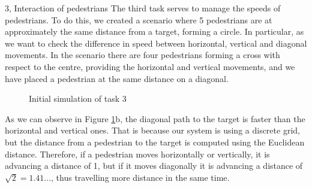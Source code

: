 \documentclass[10pt,a4paper]{article}
\begin{document}
\begin{task}{3, Interaction of pedestrians}
The third task serves to manage the speeds of pedestrians. To do this, we created a scenario where 5 pedestrians are at approximately the same distance from a target, forming a circle. In particular, as we want to check the difference in speed between horizontal, vertical and diagonal movements. In the scenario there are four pedestrians forming a cross with respect to the centre, providing the horizontal and vertical movements, and we have placed a pedestrian at the same distance on a diagonal.
\begin{figure}[H] 
\centering
{}
\caption{Initial simulation of task 3}
\label{init_sim_3}
\end{figure}

As we can observe in Figure \ref{init_sim_3}b, the diagonal path to the target is faster than the horizontal and vertical ones. That is because our system is using a discrete grid, but the distance from a pedestrian to the target is computed using the Euclidean distance. Therefore, if a pedestrian moves horizontally or vertically, it is advancing a distance of 1, but if it moves diagonally it is advancing a distance of $\sqrt{2} = 1.41...$, thus travelling more distance in the same time. 


\end{task}
\end{document}
